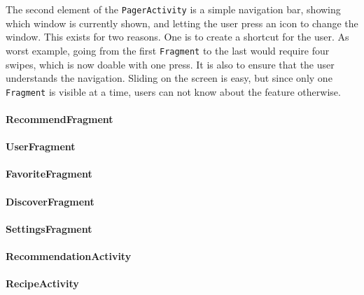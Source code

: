 The second element of the \texttt{PagerActivity} is a simple navigation bar, showing which window is currently shown, and letting the user press an icon to change the window. This exists for two reasons. One is to create a shortcut for the user. As worst example, going from the first \texttt{Fragment} to the last would require four swipes, which is now doable with one press. It is also to ensure that the user understands the navigation. Sliding on the screen is easy, but since only one \texttt{Fragment} is visible at a time, users can not know about the feature otherwise.

\paragraph{RecommendFragment}

\paragraph{UserFragment}

\paragraph{FavoriteFragment}

\paragraph{DiscoverFragment}

\paragraph{SettingsFragment}

\paragraph{RecommendationActivity}

\paragraph{RecipeActivity}